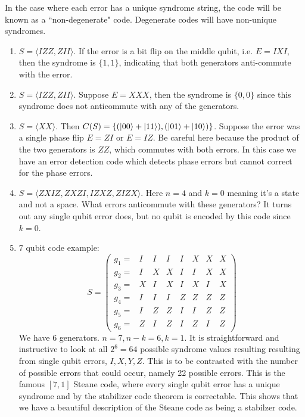 In the case where each error has a unique syndrome string, the code will be known as a ``non-degenerate" code. Degenerate codes will have non-unique syndromes.
\begin{example}
    \begin{enumerate}
        \item $S = \langle IZZ, ZII\rangle$. If the error is a bit flip on the middle qubit, i.e. $E = IXI$, then the syndrome is $\{1,1\}$, indicating that both generators anti-commute with the error. 
        \item $S = \langle IZZ, ZII\rangle$. Suppose $E = XXX$, then the syndrome is $\{0,0\}$ since this syndrome does not anticommute with any of the generators. 
        \item $S = \langle XX \rangle$. Then $C(S) = \{(\ket{00} + \ket{11}), (\ket{01} + \ket{10})\}$. Suppose the error was a single phase flip $E= ZI$ or $E = IZ$. Be careful here because the product of the two generators is $ZZ$, which commutes with both errors. In this case we have an error detection code which detects phase errors but cannot correct for the phase errors. 
        \item $S = \langle ZXIZ, ZXZI, IZXZ, ZIZX\rangle$. Here $n=4$ and $k = 0$ meaning it's a state and not a space. What errors anticommute with these generators? It turns out any single qubit error does, but no qubit is encoded by this code since $k=0$. 
        \item $7$ qubit code example: 
        \begin{equation}
            S = \begin{pmatrix}
                g_1 = & I & I & I & I & X & X & X \\
                g_2 = & I & X & X & I & I & X & X \\
                g_3 = & X & I & X & I & X & I & X \\
                g_4 = & I & I & I & Z & Z & Z & Z \\
                g_5 = & I & Z & Z & I & I & Z & Z \\
                g_6 = & Z & I & Z & I & Z & I & Z
            \end{pmatrix}
        \end{equation}
        We have 6 generators. $n=7, n-k = 6, k=1$. It is straightforward and instructive to look at all $2^6 = 64$ possible syndrome values resulting resulting from single qubit errors, $I, X, Y, Z$. This is to be contrasted with the number of possible errors that could occur, namely 22 possible errors. This is the famous $[7,1]$ Steane code, where every single qubit error has a unique syndrome and by the stabilizer code theorem is correctable. This shows that we have a beautiful description of the Steane code as being a stabilzer code. 

\end{enumerate}
\end{example}
